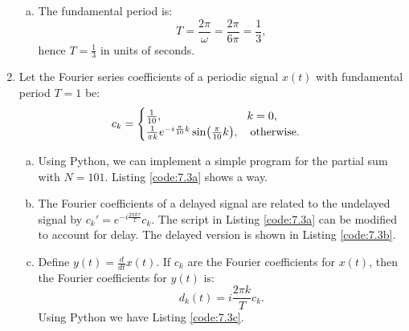 \begin{enumerate}
\begin{enumerate}[a)]
\item The fundamental period is:
$$T=\frac{2\pi}{\omega}=\frac{2\pi}{6\pi}=\frac{1}{3},$$
hence $T=\frac{1}{3}$ in units of seconds.
\end{enumerate}

\item Let the Fourier series coefficients of a periodic signal $x(t)$ with fundamental period $T=1$ be:
$$c_{k}=\begin{cases}
    \frac{1}{10}, \hspace{2.3cm}\quad k=0, \\
    \frac{1}{\pi k}e^{-i\frac{\pi}{10}k}\sin(\frac{\pi}{10}k),\quad \text{otherwise}.
\end{cases}$$

\begin{enumerate}[a)]
\item Using Python, we can implement a simple program for the partial sum with $N=101$. Listing \ref{code:7.3a} shows a way. 


\item The Fourier coefficients of a delayed signal are related to the undelayed signal by $c_{k}'=e^{-i\frac{2\pi k\tau}{T}}c_{k}$. 
The script in Listing \ref{code:7.3a} can be modified to account for delay. The delayed version is shown in Listing \ref{code:7.3b}.


\item Define $y(t)=\frac{d}{dt}x(t)$. If $c_{k}$ are the Fourier coefficients for $x(t)$, then the Fourier coefficients for $y(t)$ is:
$$d_{k}(t)=i \frac{2\pi k}{T}c_{k}.$$
Using Python we have Listing \ref{code:7.3c}.


\end{enumerate}


\end{enumerate}